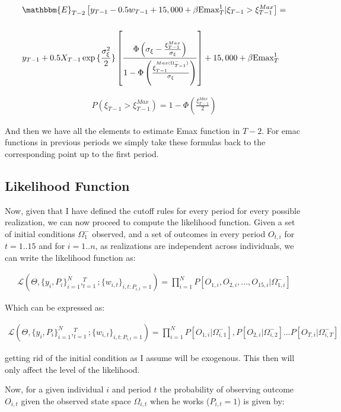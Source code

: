 \documentclass[11pt]{article}
\begin{document}
\begin{align}
 & \mathbbm{E}_{T-2}\left[ y_{T-1}-0.5w_{T-1}+15,000+\beta\text{Emax}_{T}^1|\xi_{T-1}>\xi^{Max}_{T-1}\right]=\nonumber \\[0.2in]
& 	y_{T-1}+0.5X_{T-1}\exp{\{\frac{\sigma_\xi^2}{2}\}}\left[\frac{\Phi\left(\sigma_\xi-\frac{\xi_{T-1}^{Max}}{\sigma_\xi}\right)}{1-\Phi\left( \frac{\xi_{T-1}^{Max(\Omega_{T-1}^-)}}{\sigma_\xi} \right) } \right]+15,000+\beta\text{Emax}_T^1
\end{align}

\begin{align}
	P(\xi_{T-1}>\xi^{Max}_{T-1})=1-\Phi\left(\frac{\xi_{T-1}^{Max}}{2} \right)
\end{align}

And then we have all the elements to estimate Emax function in $T-2$. For emac functions in previous periods we simply take these formulas back to the corresponding point up to the first period. 

\subsection{Likelihood Function}

Now, given that I have defined the cutoff rules for every period for every possible realization, we can now proceed to compute the likelihood function. Given a set of initial conditions $\Omega_1^-$ observed, and a set of outcomes in every period $O_{t,i}$ for $t=1..15$ and for $i=1..n$, as realizations are independent across individuals, we can write the likelihood function as:

\begin{align}
	\mathcal{L}(\Theta, \{y_i,P_i\}_{i=1}^N,_{t=1}^T;\{w_{i,t}\}_{i,t:P_{i,t}=1})=\prod_{i=1}^NP\left[ O_{1,i},O_{2,i},...,O_{15,i}|\Omega_{1,i}^-\right]
\end{align}

Which can be expressed as:

\begin{align}
	\mathcal{L}(\Theta, \{y_i,P_i\}_{i=1}^N,_{t=1}^T;\{w_{i,t}\}_{i,t:P_{i,t}=1})=\prod_{i=1}^NP[ O_{1,i}|\Omega_{i,1}^-], P[ O_{2,i}|\Omega_{i,2}^-]...P[ O_{T,i}|\Omega_{i,T}^-]
\end{align}

getting rid of the initial condition as I assume will be exogenous. This then will only affect the level of the likelihood. 

Now, for a given individual $i$ and period $t$ the probability of observing outcome $O_{i,t}$ given the observed state space $\Omega_{i,t}$ when he works ($P_{i,t}=1$) is given by:
\end{document}

